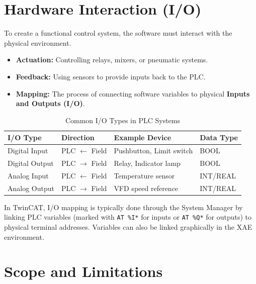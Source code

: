 \documentclass[11pt,a4paper]{article}
\begin{document}
\section{Hardware Interaction (I/O)}

To create a functional control system, the software must interact with the physical environment.

\begin{itemize}[leftmargin=*]
    \item \textbf{Actuation:} Controlling relays, mixers, or pneumatic systems.
    \item \textbf{Feedback:} Using sensors to provide inputs back to the PLC.
    \item \textbf{Mapping:} The process of connecting software variables to physical \textbf{Inputs and Outputs (I/O)}.
\end{itemize}

\begin{table}[h]
\centering
\begin{tabular}{@{}llll@{}}
\toprule
\textbf{I/O Type} & \textbf{Direction} & \textbf{Example Device} & \textbf{Data Type} \\
\midrule
Digital Input & PLC $\leftarrow$ Field & Pushbutton, Limit switch & BOOL \\
Digital Output & PLC $\rightarrow$ Field & Relay, Indicator lamp & BOOL \\
Analog Input & PLC $\leftarrow$ Field & Temperature sensor & INT/REAL \\
Analog Output & PLC $\rightarrow$ Field & VFD speed reference & INT/REAL \\
\bottomrule
\end{tabular}
\caption{Common I/O Types in PLC Systems}
\end{table}

\begin{notebox}
In TwinCAT, I/O mapping is typically done through the System Manager by linking PLC variables (marked with \texttt{AT \%I*} for inputs or \texttt{AT \%Q*} for outputs) to physical terminal addresses. Variables can also be linked graphically in the XAE environment.
\end{notebox}

\section{Scope and Limitations}
\end{document}
